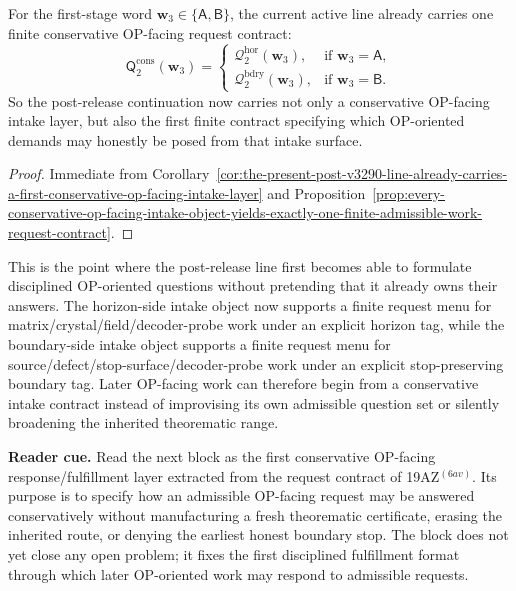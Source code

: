 \begin{corollary}
\label{cor:the-present-post-v3290-line-already-carries-a-first-finite-op-facing-request-contract}
For the first-stage word \(\mathbf w_3\in\{\mathsf A,\mathsf B\}\), the current active line already carries one finite conservative OP-facing request contract:
\[
  \mathsf{Q}^{\mathrm{cons}}_{2}(\mathbf w_3)
  =
  \begin{cases}
    \mathcal Q^{\mathrm{hor}}_{2}(\mathbf w_3), & \text{if }\mathbf w_3=\mathsf A,\\[2mm]
    \mathcal Q^{\mathrm{bdry}}_{2}(\mathbf w_3), & \text{if }\mathbf w_3=\mathsf B.
  \end{cases}
\]
So the post-release continuation now carries not only a conservative OP-facing intake layer, but also the first finite contract specifying which OP-oriented demands may honestly be posed from that intake surface.
\end{corollary}

\begin{proof}
Immediate from Corollary~\ref{cor:the-present-post-v3290-line-already-carries-a-first-conservative-op-facing-intake-layer} and Proposition~\ref{prop:every-conservative-op-facing-intake-object-yields-exactly-one-finite-admissible-work-request-contract}.
\end{proof}

\begin{remark}
\label{rem:what-the-first-conservative-op-facing-work-request-contract-now-buys}
This is the point where the post-release line first becomes able to formulate disciplined OP-oriented questions without pretending that it already owns their answers. The horizon-side intake object now supports a finite request menu for matrix/crystal/field/decoder-probe work under an explicit horizon tag, while the boundary-side intake object supports a finite request menu for source/defect/stop-surface/decoder-probe work under an explicit stop-preserving boundary tag. Later OP-facing work can therefore begin from a conservative intake contract instead of improvising its own admissible question set or silently broadening the inherited theorematic range.
\end{remark}




\noindent\textbf{Reader cue.} Read the next block as the first conservative OP-facing response/fulfillment layer extracted from the request contract of 19AZ$^{(6av)}$. Its purpose is to specify how an admissible OP-facing request may be answered conservatively without manufacturing a fresh theorematic certificate, erasing the inherited route, or denying the earliest honest boundary stop. The block does not yet close any open problem; it fixes the first disciplined fulfillment format through which later OP-oriented work may respond to admissible requests.


